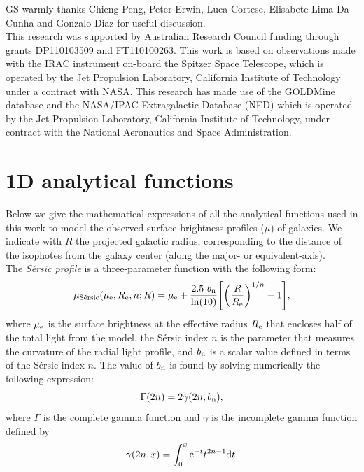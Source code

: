 \documentclass[preprint2]{emulateapj}
\begin{document}
\acknowledgments
GS warmly thanks Chieng Peng, Peter Erwin, Luca Cortese, Elisabete Lima Da Cunha and Gonzalo Diaz 
for useful discussion. \\
This research was supported by Australian Research Council funding through grants
DP110103509 and FT110100263.
This work is based on observations made with the IRAC instrument \citep{fazio2004IRAC} 
on-board the Spitzer Space Telescope, 
which is operated by the Jet Propulsion Laboratory, 
California Institute of Technology under a contract with NASA.
This research has made use of the GOLDMine database \citep{goldmine} and the NASA/IPAC Extragalactic Database (NED) 
which is operated by the Jet Propulsion Laboratory, California Institute of Technology, 
under contract with the National Aeronautics and Space Administration. 

\appendix

\section{1D analytical functions}
\label{sec:app1}
Below we give the mathematical expressions of all the analytical functions used in this work to model 
the observed surface brightness profiles ($\mu$) of galaxies.
We indicate with $R$ the projected galactic radius, 
corresponding to the distance of the isophotes from the galaxy center (along the major- or equivalent-axis). \\

The \emph{S\'ersic profile} \citep{sersic1963,sersic1968} is a three-parameter function with the following form:
\begin{equation}
\mu_{\rm S\acute{e}rsic}(\mu_{\rm e},R_{\rm e},n;R) = \mu_{\rm e} + \frac{2.5~b_{\rm n}}{\ln(10)} 
\Biggl[\biggl(\frac{R}{R_{\rm e}}\biggr)^{1/n}-1\Biggr] ,
\end{equation}
\citep{caon1993,andredakis1995,grahamdriver2005}
where $\mu_{\rm e}$ is the surface brightness at the effective radius $R_{\rm e}$ that encloses 
half of the total light from the model, 
the S\'ersic index $n$ is the parameter that measures the curvature of the radial light profile,
and $b_{\rm n}$ is a scalar value defined in terms of the S\'ersic index $n$.
The value of $b_{\rm n}$ is found by solving numerically the following expression:
\begin{equation}
\Gamma(2n) = 2\gamma(2n,b_{\rm n}),
\end{equation}
where $\Gamma$ is the complete gamma function \citep{ciotti1991} 
and $\gamma$ is the incomplete gamma function defined by 
\begin{equation}
\gamma(2n,x) = \int_{0}^{x} {\rm e}^{-t} t^{2n-1} {\rm d}t .
\end{equation} \\
\end{document}

